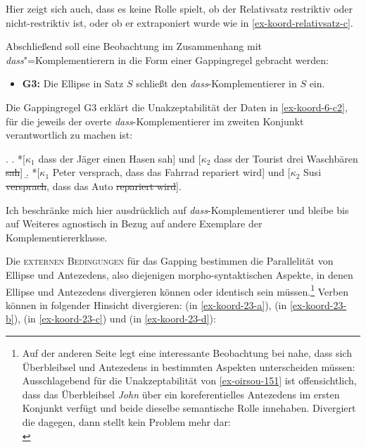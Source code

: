 Hier zeigt sich auch, dass es keine Rolle spielt, ob der Relativsatz restriktiv oder nicht-restriktiv ist, oder ob er extraponiert wurde wie in \ref{ex-koord-relativsatz-c}. 

Abschlie\ss end soll eine Beobachtung im Zusammenhang mit \emph{dass}"=Komplementierern in die Form einer Gappingregel gebracht werden:    
\begin{itemize}  
  \item[] {\bf G3:} Die Ellipse in Satz $S$ schlie\ss t den \emph{dass}-Komplementierer in $S$ ein.
\end{itemize}
Die Gappingregel G3 erklärt die Unakzeptabilität der Daten in \ref{ex-koord-6-c2}, für die jeweils der overte \emph{dass}-Komplementierer im zweiten Konjunkt verantwortlich zu machen ist:  

\ex. \label{ex-koord-6-c2}
\a. *[$\kappa_1$ dass der Jäger einen Hasen sah] und [$\kappa_2$ dass der Tourist drei Waschbären \sout{sah}]\label{ex-koord-6-c2-a}
\b. *[$\kappa_1$ Peter versprach, dass das Fahrrad repariert wird] und [$\kappa_2$ Susi \sout{versprach}, dass das Auto \sout{repariert wird}].\label{ex-koord-6-c2-b} 

Ich beschränke mich hier ausdrücklich auf \emph{dass}-Komplementierer und bleibe bis auf Weiteres agnostisch in Bezug auf andere Exemplare der Komplementiererklasse. 


Die \textsc{externen Bedingungen} \label{sec-ext-bedingungen} für das Gapping bestimmen die Parallelität von Ellipse und Antezedens, also diejenigen morpho-syntaktischen Aspekte, in denen Ellipse und Antezedens divergieren können oder identisch sein müssen.\footnote{Auf der anderen Seite legt eine interessante Beobachtung bei \cite{Oirsouw:87} nahe, dass sich Überbleibsel und Antezedens in bestimmten Aspekten unterscheiden müssen:\\
Ausschlagebend für die Unakzeptabilität von \ref{ex-oirsou-151} ist offensichtlich, dass das Überbleibsel {\it John} über ein koreferentielles Antezedens im ersten Konjunkt verfügt und beide dieselbe semantische Rolle innehaben. Divergiert die  dagegen, dann stellt  kein Problem mehr dar:\\  
} Verben können in folgender Hinsicht divergieren:  (in \ref{ex-koord-23-a}),  (in \ref{ex-koord-23-b}),  (in \ref{ex-koord-23-c}) und  (in \ref{ex-koord-23-d}):

